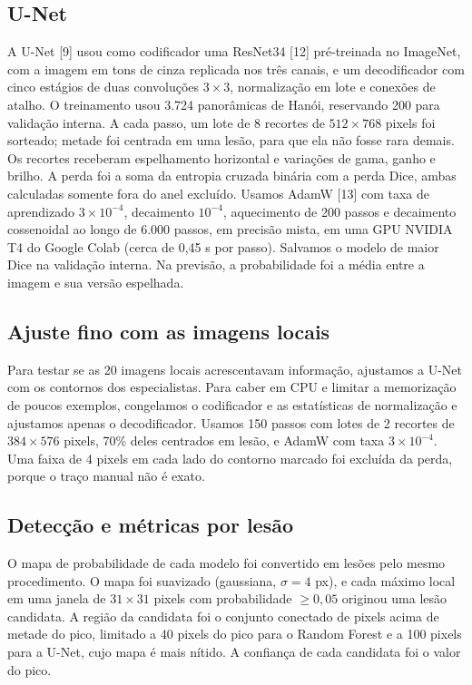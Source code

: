 \documentclass[twocolumn]{article}
\begin{document}
\subsection{U-Net}

A U-Net [9] usou como codificador uma ResNet34 [12] pré-treinada no ImageNet, com a imagem em tons de cinza replicada nos três canais, e um decodificador com cinco estágios de duas convoluções $3 \times 3$, normalização em lote e conexões de atalho. O treinamento usou 3.724 panorâmicas de Hanói, reservando 200 para validação interna. A cada passo, um lote de 8 recortes de $512 \times 768$ pixels foi sorteado; metade foi centrada em uma lesão, para que ela não fosse rara demais. Os recortes receberam espelhamento horizontal e variações de gama, ganho e brilho. A perda foi a soma da entropia cruzada binária com a perda Dice, ambas calculadas somente fora do anel excluído. Usamos AdamW [13] com taxa de aprendizado $3 \times 10^{-4}$, decaimento $10^{-4}$, aquecimento de 200 passos e decaimento cossenoidal ao longo de 6.000 passos, em precisão mista, em uma GPU NVIDIA T4 do Google Colab (cerca de 0,45 s por passo). Salvamos o modelo de maior Dice na validação interna. Na previsão, a probabilidade foi a média entre a imagem e sua versão espelhada.

\subsection{Ajuste fino com as imagens locais}

Para testar se as 20 imagens locais acrescentavam informação, ajustamos a U-Net com os contornos dos especialistas. Para caber em CPU e limitar a memorização de poucos exemplos, congelamos o codificador e as estatísticas de normalização e ajustamos apenas o decodificador. Usamos 150 passos com lotes de 2 recortes de $384 \times 576$ pixels, 70\% deles centrados em lesão, e AdamW com taxa $3 \times 10^{-4}$. Uma faixa de 4 pixels em cada lado do contorno marcado foi excluída da perda, porque o traço manual não é exato.

\subsection{Detecção e métricas por lesão}

O mapa de probabilidade de cada modelo foi convertido em lesões pelo mesmo procedimento. O mapa foi suavizado (gaussiana, $\sigma = 4$ px), e cada máximo local em uma janela de $31 \times 31$ pixels com probabilidade $\geq 0{,}05$ originou uma lesão candidata. A região da candidata foi o conjunto conectado de pixels acima de metade do pico, limitado a 40 pixels do pico para o Random Forest e a 100 pixels para a U-Net, cujo mapa é mais nítido. A confiança de cada candidata foi o valor do pico.
\end{document}
